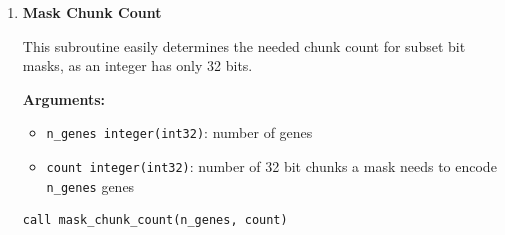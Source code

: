 \begin{enumerate}
\begin{itemize}
            \item \lstinline!temp_paralog_vector real(real64), dimension(n_dims)!: vector used for pruning subsets
            \item \lstinline!paralog_norms real(real64), dimension(n_genes)!: needed for subset pruning, holds the euclidean norms of genes (you can use the \lstinline!norm! function from \lstinline!f42_utils! for this)
            \item \lstinline!sorted_paralog_norms_perm integer(int32), dimension(n_genes)!: needed for subset pruning, as the minimum norm of the genes that could extend a subset should not be lower than the subset angle to the \lstinline!ancestor!
            \item \lstinline!temp_work_array real(real64), dimension(n_genes)!: needed for efficient check of minimum value after a certain index
            \item \lstinline!ierr integer(int32)!: error code
        \end{itemize}

\begin{lstlisting}[caption={Subfunctionalization Detection}]
call detect_subfunctionalization(ancestor, genes, n_genes, n_dims, rdi_threshold, filtered_paralogs_mask, &
                                 n_mask_chunks, n_results, max_subset_size, work_arr_paralog_subsets, &
                                 n_paralog_subsets, active_mask, temp_paralog_vector, paralog_norms, &
                                 sorted_paralog_norms_perm, temp_work_array, ierr)
\end{lstlisting}


    \item \textbf{Mask Chunk Count}

        This subroutine easily determines the needed chunk count for subset bit masks, as an integer has only 32 bits.

        \textbf{Arguments:}
        \begin{itemize}
            \item \lstinline!n_genes integer(int32)!: number of genes
            \item \lstinline!count integer(int32)!: number of 32 bit chunks a mask needs to encode \lstinline!n_genes! genes
        \end{itemize}

\begin{lstlisting}[caption={Mask Chunk Count}]
call mask_chunk_count(n_genes, count)
\end{lstlisting}



\end{enumerate}
